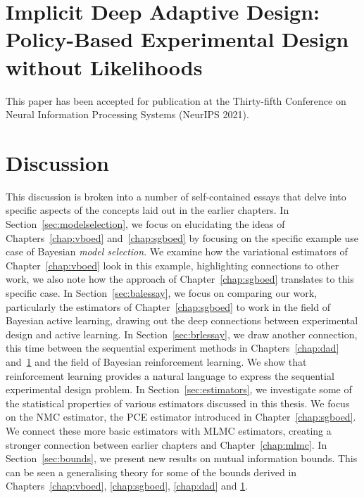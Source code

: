 \documentclass[a4paper, 10pt]{report}
\theoremstyle{plain}
\begin{document}
	\chapter{Implicit Deep Adaptive Design: Policy-Based Experimental Design without Likelihoods}
	\label{chap:idad}
	This paper has been accepted for publication at the Thirty-fifth Conference on Neural Information Processing Systems (NeurIPS 2021).
	
	
	
	\chapter{Discussion}
	\label{chap:discussion}
	This discussion is broken into a number of self-contained essays that delve into specific aspects of the concepts laid out in the earlier chapters.
	In Section~\ref{sec:modelselection}, we focus on elucidating the ideas of Chapters~\ref{chap:vboed} and~\ref{chap:sgboed} by focusing on the specific example use case of Bayesian \emph{model selection}. We examine how the variational estimators of Chapter~\ref{chap:vboed} look in this example, highlighting connections to other work, we also note how the approach of Chapter~\ref{chap:sgboed} translates to this specific case.
	In Section~\ref{sec:balessay}, we focus on comparing our work, particularly the estimators of Chapter~\ref{chap:sgboed} to work in the field of Bayesian active learning, drawing out the deep connections between experimental design and active learning.
	In Section~\ref{sec:brlessay}, we draw another connection, this time between the sequential experiment methods in Chapters~\ref{chap:dad} and~\ref{chap:idad} and the field of Bayesian reinforcement learning. We show that reinforcement learning provides a natural language to express the sequential experimental design problem.
	In Section~\ref{sec:estimators}, we investigate some of the statistical properties of various estimators discussed in this thesis. We focus on the NMC estimator, the PCE estimator introduced in Chapter~\ref{chap:sgboed}. We connect these more basic estimators with MLMC estimators, creating a stronger connection between earlier chapters and Chapter~\ref{chap:mlmc}.
	In Section~\ref{sec:bounds}, we present new results on mutual information bounds. This can be seen a generalising theory for some of the bounds derived in Chapters~\ref{chap:vboed}, \ref{chap:sgboed}, \ref{chap:dad} and \ref{chap:idad}.
\end{document}
